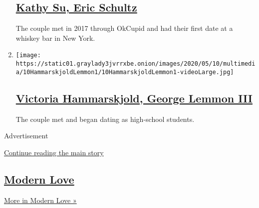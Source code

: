 \begin{enumerate}
  \hypertarget{kathy-su-eric-schultz}{%
  \subsection{\texorpdfstring{\href{/2020/05/17/fashion/weddings/kathy-su-eric-schultz.html}{Kathy
  Su, Eric
  Schultz}}{Kathy Su, Eric Schultz}}\label{kathy-su-eric-schultz}}

  The couple met in 2017 through OkCupid and had their first date at a
  whiskey bar in New York.
\item
  \texttt{[image: https://static01.graylady3jvrrxbe.onion/images/2020/05/10/multimedia/10HammarskjoldLemmon1/10HammarskjoldLemmon1-videoLarge.jpg]}

  \hypertarget{victoria-hammarskjold-george-lemmon-iii}{%
  \subsection{\texorpdfstring{\href{/2020/05/10/fashion/weddings/victoria-hammarskjold-george-lemmon-iii.html}{Victoria
  Hammarskjold, George Lemmon
  III}}{Victoria Hammarskjold, George Lemmon III}}\label{victoria-hammarskjold-george-lemmon-iii}}

  The couple met and began dating as high-school students.
\end{enumerate}

Advertisement

\protect\hyperlink{after-mid4}{Continue reading the main story}

\hypertarget{modern-love-1}{%
\subsection{\texorpdfstring{\href{/column/modern-love}{Modern
Love}}{Modern Love}}\label{modern-love-1}}

\href{/column/modern-love}{More in Modern Love »}

